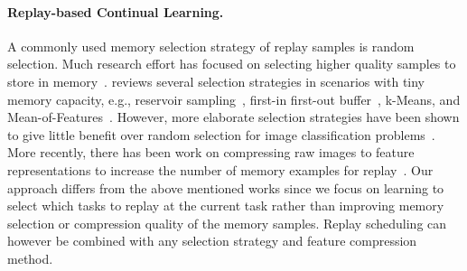 \vspace{-3mm}
\paragraph{Replay-based Continual Learning.} A commonly used memory selection strategy of replay samples is random selection. 
Much research effort has focused on selecting higher quality samples to store in memory~\citep{aljundi2019gradient, borsos2020coresets, chaudhry2019tiny, chrysakis2020online, hayes2019memory, isele2018selective, lopez2017gradient, nguyen2017variational, rebuffi2017icarl, yoon2021online}. \citet{chaudhry2019tiny} reviews several selection strategies in scenarios with tiny memory capacity, e.g., reservoir sampling~\citep{vitter1985random}, first-in first-out buffer~\citep{lopez2017gradient}, k-Means, and Mean-of-Features~\citep{rebuffi2017icarl}. However, more elaborate selection strategies have been shown to give little benefit over random selection for image classification problems~\citep{chaudhry2018riemannian, hayes2020remind}. More recently, there has been work on compressing raw images to feature representations to increase the number of memory examples for replay~\citep{hayes2020remind, iscen2020memory, pellegrini2019latent}. 
Our approach differs from the above mentioned works since we focus on learning to select which tasks to replay at the current task rather than improving memory selection or compression quality of the memory samples. %
Replay scheduling can however be combined with any selection strategy and feature compression method. %


